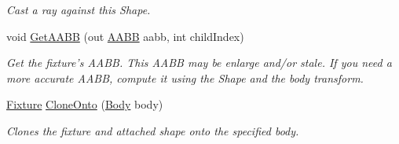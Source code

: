 \begin{DoxyCompactItemize}
\begin{DoxyCompactList}\small\item\em Cast a ray against this Shape. \end{DoxyCompactList}\item 
void \hyperlink{class_farseer_physics_1_1_dynamics_1_1_fixture_a388f0e98b873fb937cf82ff174b714d4}{Get\+A\+A\+B\+B} (out \hyperlink{struct_farseer_physics_1_1_collision_1_1_a_a_b_b}{A\+A\+B\+B} aabb, int child\+Index)
\begin{DoxyCompactList}\small\item\em Get the fixture's A\+A\+B\+B. This A\+A\+B\+B may be enlarge and/or stale. If you need a more accurate A\+A\+B\+B, compute it using the Shape and the body transform. \end{DoxyCompactList}\item 
\hyperlink{class_farseer_physics_1_1_dynamics_1_1_fixture}{Fixture} \hyperlink{class_farseer_physics_1_1_dynamics_1_1_fixture_a9abfec3ae0bd8aa8219780162c4688be}{Clone\+Onto} (\hyperlink{class_farseer_physics_1_1_dynamics_1_1_body}{Body} body)
\begin{DoxyCompactList}\small\item\em Clones the fixture and attached shape onto the specified body. \end{DoxyCompactList}\end{DoxyCompactItemize}
